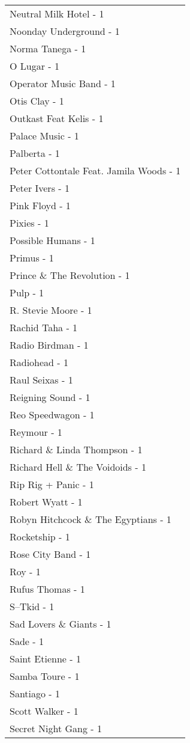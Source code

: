 \documentclass[
]{article}
\begin{document}
\begin{longtable}{l}
Neutral Milk Hotel - 1 \\ 
Noonday Underground - 1 \\ 
Norma Tanega - 1 \\ 
O Lugar - 1 \\ 
Operator Music Band - 1 \\ 
Otis Clay - 1 \\ 
Outkast Feat Kelis - 1 \\ 
Palace Music - 1 \\ 
Palberta - 1 \\ 
Peter Cottontale Feat. Jamila Woods - 1 \\ 
Peter Ivers - 1 \\ 
Pink Floyd - 1 \\ 
Pixies - 1 \\ 
Possible Humans - 1 \\ 
Primus - 1 \\ 
Prince \& The Revolution - 1 \\ 
Pulp - 1 \\ 
R. Stevie Moore - 1 \\ 
Rachid Taha - 1 \\ 
Radio Birdman - 1 \\ 
Radiohead - 1 \\ 
Raul Seixas - 1 \\ 
Reigning Sound - 1 \\ 
Reo Speedwagon - 1 \\ 
Reymour - 1 \\ 
Richard \& Linda Thompson - 1 \\ 
Richard Hell \& The Voidoids - 1 \\ 
Rip Rig + Panic - 1 \\ 
Robert Wyatt - 1 \\ 
Robyn Hitchcock \& The Egyptians - 1 \\ 
Rocketship - 1 \\ 
Rose City Band - 1 \\ 
Roy - 1 \\ 
Rufus Thomas - 1 \\ 
S--Tkid - 1 \\ 
Sad Lovers \& Giants - 1 \\ 
Sade - 1 \\ 
Saint Etienne - 1 \\ 
Samba Toure - 1 \\ 
Santiago - 1 \\ 
Scott Walker - 1 \\ 
Secret Night Gang - 1 \\ 

\end{longtable}
\end{document}
